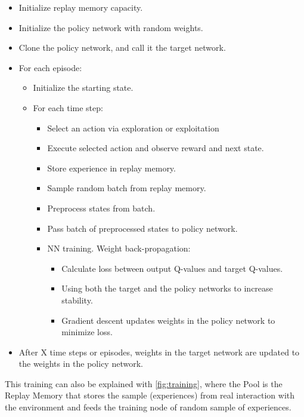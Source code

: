 			\begin{itemize}
				\item[\textendash]Initialize replay memory capacity.
				\item[\textendash]Initialize the policy network with random weights.
				\item[\textendash]Clone the policy network, and call it the target network.
				\item[\textendash]For each episode:
				\begin{itemize}
					\item[\textendash]Initialize the starting state.
					\item[\textendash]For each time step:
					\begin{itemize}
						\item[\textendash]Select an action via exploration or exploitation
						\item[\textendash]Execute selected action and observe reward and next state.
						\item[\textendash]Store experience in replay memory.
						\item[\textendash]Sample random batch from replay memory.
						\item[\textendash]Preprocess states from batch.
						\item[\textendash]Pass batch of preprocessed states to policy network.
						\item[\textendash]NN training. Weight back-propagation:
						\begin{itemize}
							\item[\textendash]Calculate loss between output Q-values and target Q-values.
							\item[\textendash]Using both the target and the policy networks to increase stability.
							\item[\textendash]Gradient descent updates weights in the policy network to minimize loss.
						\end{itemize}
						
					\end{itemize}
				\end{itemize}
				\item[\textendash]After X time steps or episodes, weights in the target network are updated to the weights in the policy network.
			\end{itemize}
			
			This training can also be explained with \autoref{fig:training}, where the Pool is the Replay Memory that stores the sample (experiences) from real interaction with the environment and feeds the training node of random sample of experiences.
			
